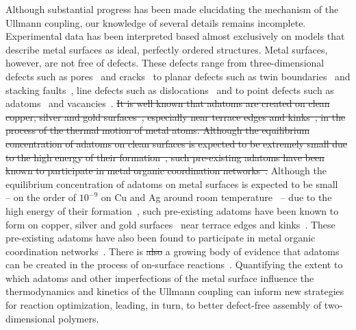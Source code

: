 \documentclass[aps,prb,amsmath,amssymb,11pt]{revtex4-1}
\newcommand{\zhzh}{\color{blue}}
\begin{document}
Although substantial progress has been made elucidating the mechanism of the Ullmann coupling, our knowledge of several details remains incomplete. Experimental data has been interpreted based almost exclusively on models that describe metal surfaces as ideal, perfectly ordered structures. 
%
Metal surfaces, however, are not free of defects. These defects range from three-dimensional defects such as pores~\cite{ullmann_72} and cracks~\cite{ullmann_73} to planar defects such as twin boundaries~\cite{ullmann_74} and stacking faults~\cite{ullmann_75}, line defects such as dislocations~\cite{Ullmann_76} and to point defects such as adatoms~\cite{Ullmann_77} and vacancies~\cite{ullmann_78}.
%
\sout{It is well known that adatoms are created on clean copper, silver and gold surfaces~\cite{ullmann_79, ullmann_58}, especially near terrace edges and kinks~\cite{ullmann_84, ullmann_85}, in the process of the thermal motion of metal atoms. 
Although the equilibrium concentration of adatoms on clean surfaces is expected to be extremely small due to the high energy of their formation~\cite{chemeurope2017}, such pre-existing adatoms have been known to participate in metal organic coordination networks~\cite{ullmann_80, ullmann_81, ullmann_82, ullmann_83}.}
{\zhzh Although the equilibrium concentration of adatoms on metal surfaces is expected to be small~\cite{lin2005two, ullmann_175} -- on the order of $10^{-9}$ on Cu and Ag around room temperature~\cite{ullmann_175} -- due to the high energy of their formation~\cite{chemeurope2017}, such pre-existing adatoms have been known to form on copper, silver and gold surfaces~\cite{ullmann_79, ullmann_58} near terrace edges and kinks~\cite{ullmann_84, ullmann_85}. These pre-existing adatoms have also been found to participate in metal organic coordination networks~\cite{ullmann_80, ullmann_81, ullmann_82, ullmann_83, ullmann_170, ullmann_147}.}
There is \sout{also} a growing body of evidence that adatoms can be created in the process of on-surface reactions~\cite{ullmann_146, ullmann_53, chematerial2019, ullmann_147, chemeurope2017, ullmann_98, ullmann_91}. %
Quantifying the extent to which adatoms and other imperfections of the metal surface influence the thermodynamics and kinetics of the Ullmann coupling can inform new strategies for reaction optimization, leading, in turn, to better defect-free assembly of two-dimensional polymers. 
\end{document}
